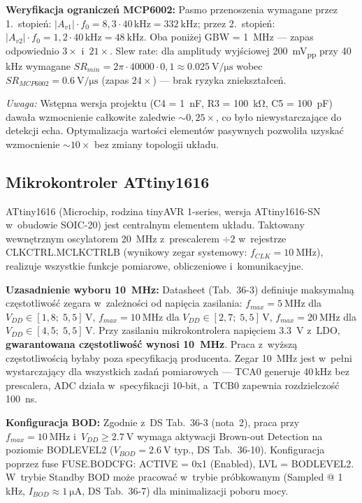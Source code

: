 \documentclass[a4paper,11pt]{article}
\begin{document}
\textbf{Weryfikacja ograniczeń MCP6002:} Pasmo przenoszenia wymagane
przez 1.~stopień: $|A_{v1}| \cdot f_0 = 8{,}3 \cdot 40\,\text{kHz} = \SI{332}{\kilo\hertz}$;
przez 2.~stopień: $|A_{v2}| \cdot f_0 = 1{,}2 \cdot 40\,\text{kHz} = \SI{48}{\kilo\hertz}$.
Oba poniżej GBW = \SI{1}{\mega\hertz} --- zapas odpowiednio $3\times$ i~$21\times$.
Slew rate: dla amplitudy wyjściowej \SI{200}{\milli\volt_{pp}} przy 40\,kHz wymagane
$SR_{min} = 2\pi \cdot 40000 \cdot 0{,}1 \approx \SI{0,025}{\volt\per\micro\second}$
wobec $SR_{MCP6002} = \SI{0,6}{\volt\per\micro\second}$ (zapas $24\times$) ---
brak ryzyka zniekształceń.

\textit{Uwaga:} Wstępna wersja projektu (C4 = \SI{1}{\nano\farad}, R3 = \SI{100}{\kilo\ohm},
C5 = \SI{100}{\pico\farad}) dawała wzmocnienie całkowite zaledwie ${\sim}0{,}25\times$,
co było niewystarczające do detekcji echa. Optymalizacja wartości elementów
pasywnych pozwoliła uzyskać wzmocnienie ${\sim}10\times$ bez zmiany topologii
układu.

\subsection{Mikrokontroler ATtiny1616}
\label{sec:mcu}

ATtiny1616 (Microchip, rodzina tinyAVR 1-series, wersja ATtiny1616-SN
w~obudowie SOIC-20) jest centralnym elementem
układu. Taktowany wewnętrznym oscylatorem \SI{20}{\mega\hertz} z~prescalerem
$\div 2$ w~rejestrze CLKCTRL.MCLKCTRLB (wynikowy zegar systemowy:
$f_{CLK} = \SI{10}{\mega\hertz}$), realizuje wszystkie funkcje pomiarowe,
obliczeniowe i~komunikacyjne.

\textbf{Uzasadnienie wyboru \SI{10}{\mega\hertz}:} Datasheet (Tab.~36-3) definiuje
maksymalną częstotliwość zegara w~zależności od napięcia zasilania:
$f_{max} = \SI{5}{\mega\hertz}$ dla $V_{DD} \in [1{,}8;\; 5{,}5]$\,V,
$f_{max} = \SI{10}{\mega\hertz}$ dla $V_{DD} \in [2{,}7;\; 5{,}5]$\,V,
$f_{max} = \SI{20}{\mega\hertz}$ dla $V_{DD} \in [4{,}5;\; 5{,}5]$\,V.
Przy zasilaniu mikrokontrolera napięciem \SI{3,3}{\volt} z~LDO,
\textbf{gwarantowana częstotliwość wynosi \SI{10}{\mega\hertz}}. Praca
z~wyższą częstotliwością byłaby poza specyfikacją producenta. Zegar
\SI{10}{\mega\hertz} jest w~pełni wystarczający dla wszystkich zadań
pomiarowych --- TCA0 generuje 40\,kHz bez prescalera, ADC działa
w~specyfikacji 10-bit, a~TCB0 zapewnia rozdzielczość \SI{100}{\nano\second}.

\textbf{Konfiguracja BOD:} Zgodnie z~DS Tab.~36-3 (nota~2), praca przy
$f_{max} = \SI{10}{\mega\hertz}$ i~$V_{DD} \geq \SI{2,7}{\volt}$ wymaga
aktywacji Brown-out Detection na poziomie BODLEVEL2 ($V_{BOD} = \SI{2,6}{\volt}$
typ., DS Tab.~36-10). Konfiguracja poprzez fuse FUSE.BODCFG:
ACTIVE = 0x1 (Enabled), LVL = BODLEVEL2. W~trybie Standby BOD może
pracować w~trybie próbkowanym (Sampled @ 1\,kHz, $I_{BOD} \approx
\SI{1}{\micro\ampere}$, DS Tab.~36-7) dla minimalizacji poboru mocy.
\end{document}
